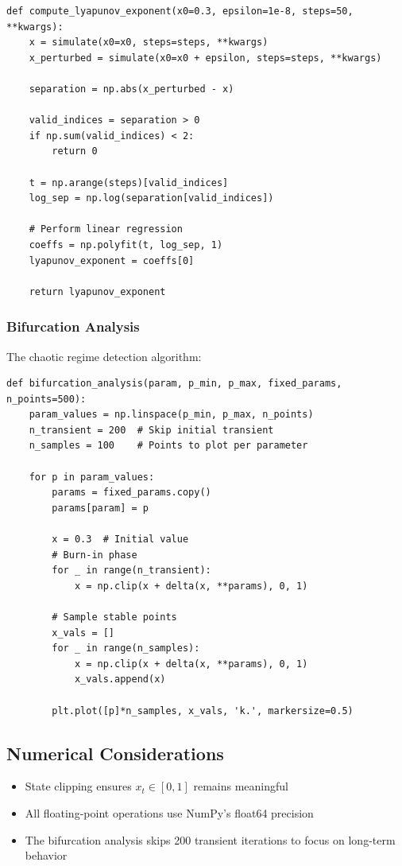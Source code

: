 \documentclass[a4paper, 10pt]{article}
\begin{document}
\begin{verbatim}
def compute_lyapunov_exponent(x0=0.3, epsilon=1e-8, steps=50, **kwargs):
    x = simulate(x0=x0, steps=steps, **kwargs)
    x_perturbed = simulate(x0=x0 + epsilon, steps=steps, **kwargs)

    separation = np.abs(x_perturbed - x)

    valid_indices = separation > 0
    if np.sum(valid_indices) < 2:
        return 0

    t = np.arange(steps)[valid_indices]
    log_sep = np.log(separation[valid_indices])

    # Perform linear regression
    coeffs = np.polyfit(t, log_sep, 1)
    lyapunov_exponent = coeffs[0]

    return lyapunov_exponent
\end{verbatim}
\vspace{-3em}

\subsubsection{Bifurcation Analysis}
The chaotic regime detection algorithm:

\begin{verbatim}
def bifurcation_analysis(param, p_min, p_max, fixed_params, n_points=500):
    param_values = np.linspace(p_min, p_max, n_points)
    n_transient = 200  # Skip initial transient
    n_samples = 100    # Points to plot per parameter
    
    for p in param_values:
        params = fixed_params.copy()
        params[param] = p
        
        x = 0.3  # Initial value
        # Burn-in phase
        for _ in range(n_transient):
            x = np.clip(x + delta(x, **params), 0, 1)
        
        # Sample stable points
        x_vals = []
        for _ in range(n_samples):
            x = np.clip(x + delta(x, **params), 0, 1)
            x_vals.append(x)
        
        plt.plot([p]*n_samples, x_vals, 'k.', markersize=0.5)
\end{verbatim}
\vspace{-3em}

\subsection{Numerical Considerations}
\begin{itemize}
	\item State clipping ensures $x_t \in [0,1]$ remains meaningful
	\item All floating-point operations use NumPy's float64 precision
	\item The bifurcation analysis skips 200 transient iterations to focus on long-term behavior
\end{itemize}
\end{document}

